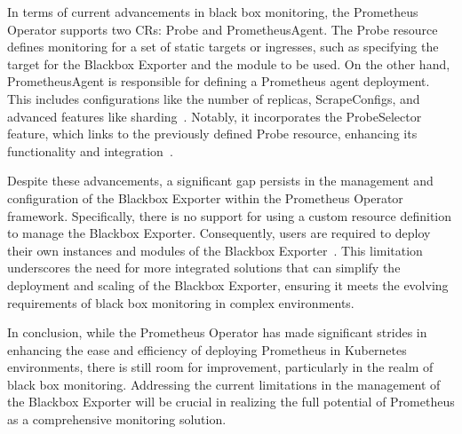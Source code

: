 In terms of current advancements in black box monitoring, the Prometheus Operator supports two \ac{CR}s: Probe and PrometheusAgent. The Probe resource defines monitoring for a set of static targets or ingresses, such as specifying the target for the Blackbox Exporter and the module to be used. On the other hand, PrometheusAgent is responsible for defining a Prometheus agent deployment. This includes configurations like the number of replicas, ScrapeConfigs, and advanced features like sharding~\parencite{prometheusoperatorPrometheusAgentSupport}. Notably, it incorporates the ProbeSelector feature, which links to the previously defined Probe resource, enhancing its functionality and integration~\parencite{prometheusoperatorAPIReference}.

Despite these advancements, a significant gap persists in the management and configuration of the Blackbox Exporter within the Prometheus Operator framework. Specifically, there is no support for using a custom resource definition to manage the Blackbox Exporter. Consequently, users are required to deploy their own instances and modules of the Blackbox Exporter~\parencite{prometheusBlackboxExporter2023}. This limitation underscores the need for more integrated solutions that can simplify the deployment and scaling of the Blackbox Exporter, ensuring it meets the evolving requirements of black box monitoring in complex environments. 

In conclusion, while the Prometheus Operator has made significant strides in enhancing the ease and efficiency of deploying Prometheus in Kubernetes environments, there is still room for improvement, particularly in the realm of black box monitoring. Addressing the current limitations in the management of the Blackbox Exporter will be crucial in realizing the full potential of Prometheus as a comprehensive monitoring solution. 